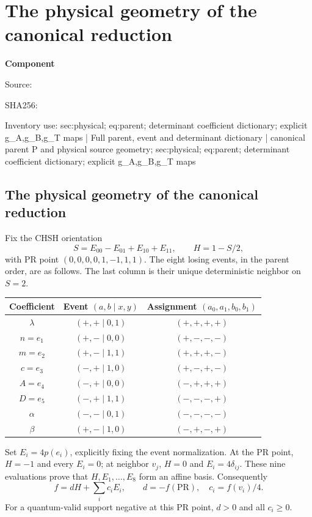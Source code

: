 \chapter{The physical geometry of the canonical reduction}
\label{component:p0c8f420148b7}
\noindent\textbf{Component }\par
{\small\noindent Source: \par}
{\small\noindent SHA256: \par}
{\small\noindent Inventory use: sec:physical; eq:parent; determinant coefficient dictionary; explicit g\_\allowbreak{}A,g\_\allowbreak{}B,g\_\allowbreak{}T maps | Full parent, event and determinant dictionary | canonical parent P and physical source geometry; sec:physical; eq:parent; determinant coefficient dictionary; explicit g\_\allowbreak{}A,g\_\allowbreak{}B,g\_\allowbreak{}T maps\par}
\medskip
\section{The physical geometry of the canonical reduction}\label{p0c8f420148b7:sec:physical}
Fix the CHSH orientation
\[S=E_{00}-E_{01}+E_{10}+E_{11},\qquad H=1-S/2,\]
with PR point $(0,0,0,0,1,-1,1,1)$. The eight losing events, in the parent order, are as follows. The last column is their unique deterministic neighbor on $S=2$.
\begin{center}\small
\begin{tabular}{ccc}\toprule
Coefficient & Event $(a,b\mid x,y)$ & Assignment $(a_0,a_1,b_0,b_1)$\\\midrule
$\lambda$ & $(+,+\mid0,1)$ & $(+,+,+,+)$\\
$n=e_1$ & $(+,-\mid0,0)$ & $(+,-,-,-)$\\
$m=e_2$ & $(+,-\mid1,1)$ & $(+,+,+,-)$\\
$c=e_3$ & $(-,+\mid1,0)$ & $(+,-,+,-)$\\
$A=e_4$ & $(-,+\mid0,0)$ & $(-,+,+,+)$\\
$D=e_5$ & $(-,+\mid1,1)$ & $(-,-,-,+)$\\
$\alpha$ & $(-,-\mid0,1)$ & $(-,-,-,-)$\\
$\beta$ & $(+,-\mid1,0)$ & $(-,+,-,+)$\\\bottomrule
\end{tabular}\end{center}
Set $E_i=4p(e_i)$, explicitly fixing the event normalization. At the PR point, $H=-1$ and every $E_i=0$; at neighbor $v_j$, $H=0$ and $E_i=4\delta_{ij}$. These nine evaluations prove that $H,E_1,\ldots,E_8$ form an affine basis. Consequently
\[
f=dH+\sum_i c_iE_i,\qquad d=-f(\mathrm{PR}),\quad c_i=f(v_i)/4.
\]
For a quantum-valid support negative at this PR point, $d>0$ and all $c_i\ge0$.


